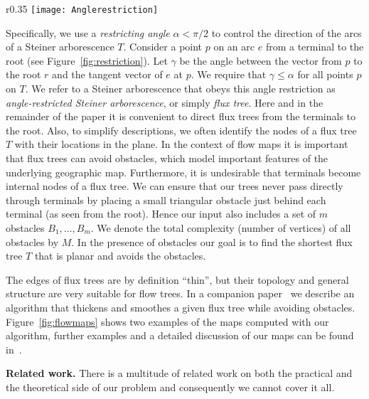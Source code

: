 \documentclass{journalA4}
\begin{document}
\begin{wrapfigure}[7]{r}{0.35\textwidth}
   \centering
   \texttt{[image: Anglerestriction]}
   \small{\caption{The angle restriction. \label{fig:restriction}}}
\end{wrapfigure}
Specifically, we use a \emph{restricting angle} $\alpha < \pi/2$ to control the direction of the arcs of a Steiner arborescence $T$. Consider a point $p$ on an arc $e$ from a terminal to the root (see Figure~\ref{fig:restriction}). Let $\gamma$ be the angle between the vector from $p$ to the root $r$ and the tangent vector of $e$ at $p$. We require that $\gamma \leq \alpha$ for all points $p$ on $T$. We refer to a Steiner arborescence that obeys this angle restriction as \emph{angle-restricted Steiner arborescence}, or simply \emph{flux tree}.
Here and in the remainder of the paper it is convenient to direct flux trees from the terminals to the root. Also, to simplify descriptions, we often identify the nodes of a flux tree $T$ with their locations in the plane.
In the context of flow maps it is important that flux trees can avoid obstacles, which model important features of the underlying geographic map. Furthermore, it is undesirable that terminals become internal nodes of a flux tree. We can ensure that our trees never pass directly through terminals by placing a small triangular obstacle just behind  each terminal (as seen from the root). Hence our input also includes a set of $m$ obstacles $B_1,\ldots, B_m$. We denote the total complexity (number of vertices) of all obstacles by $M$. In the presence of obstacles our goal is to find the shortest flux tree $T$ that is planar and avoids the obstacles.

The edges of flux trees are by definition ``thin'', but their topology and general structure are very suitable for flow trees. In a companion paper~\cite{InfoVisFlowMap} we describe an algorithm that thickens and smoothes a given flux tree while avoiding obstacles. Figure~\ref{fig:flowmaps} shows two examples of the maps computed with our algorithm, further examples and a detailed discussion of our maps can be found in~\cite{InfoVisFlowMap}.

\smallskip\noindent
{\bfseries Related work.} There is a multitude of related work on both the practical and the theoretical side of our problem and consequently we cannot cover it all.
\end{document}

